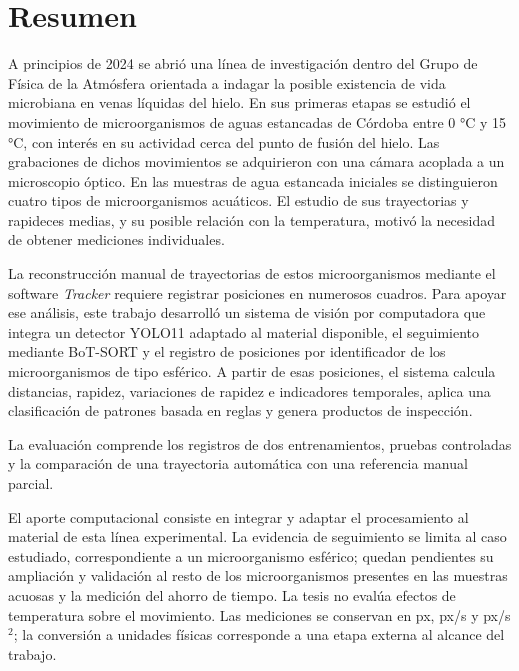 \chapter*{Resumen}

A principios de 2024 se abrió una línea de investigación dentro del Grupo de Física de la Atmósfera orientada a indagar la posible existencia de vida microbiana en venas líquidas del hielo. En sus primeras etapas se estudió el movimiento de microorganismos de aguas estancadas de Córdoba entre 0 °C y 15 °C, con interés en su actividad cerca del punto de fusión del hielo. Las grabaciones de dichos movimientos se adquirieron con una cámara acoplada a un microscopio óptico. En las muestras de agua estancada iniciales se distinguieron cuatro tipos de microorganismos acuáticos. El estudio de sus trayectorias y rapideces medias, y su posible relación con la temperatura, motivó la necesidad de obtener mediciones individuales.

La reconstrucción manual de trayectorias de estos microorganismos mediante el software \textit{Tracker} requiere registrar posiciones en numerosos cuadros. Para apoyar ese análisis, este trabajo desarrolló un sistema de visión por computadora que integra un detector YOLO11 adaptado al material disponible, el seguimiento mediante BoT-SORT y el registro de posiciones por identificador de los microorganismos de tipo esférico. A partir de esas posiciones, el sistema calcula distancias, rapidez, variaciones de rapidez e indicadores temporales, aplica una clasificación de patrones basada en reglas y genera productos de inspección.

La evaluación comprende los registros de dos entrenamientos, pruebas controladas y la comparación de una trayectoria automática con una referencia manual parcial.

El aporte computacional consiste en integrar y adaptar el procesamiento al material de esta línea experimental. La evidencia de seguimiento se limita al caso estudiado, correspondiente a un microorganismo esférico; quedan pendientes su ampliación y validación al resto de los microorganismos presentes en las muestras acuosas y la medición del ahorro de tiempo. La tesis no evalúa efectos de temperatura sobre el movimiento. Las mediciones se conservan en px, px/s y px/s$^2$; la conversión a unidades físicas corresponde a una etapa externa al alcance del trabajo.
